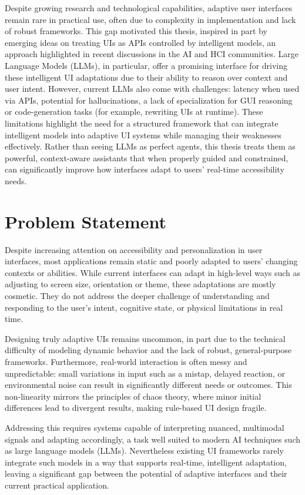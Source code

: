 Despite growing research and technological capabilities, adaptive user interfaces remain rare in practical use, often due to complexity in implementation and lack of robust frameworks. This gap motivated this thesis, inspired in part by emerging ideas on treating UIs as APIs controlled by intelligent models, an approach highlighted in recent discussions in the AI and HCI communities. Large Language Models (LLMs), in particular, offer a promising interface for driving these intelligent UI adaptations due to their ability to reason over context and user intent. However, current LLMs also come with challenges: latency when used via APIs, potential for hallucinations, a lack of specialization for GUI reasoning or code-generation tasks (for example, rewriting UIs at runtime). These limitations highlight the need for a structured framework that can integrate intelligent models into adaptive UI systems while managing their weaknesses effectively. Rather than seeing LLMs as perfect agents, this thesis treats them as powerful, context-aware assistants that when properly guided and constrained, can significantly improve how interfaces adapt to users' real-time accessibility needs.

\section{Problem Statement}
Despite increasing attention on accessibility and personalization in user interfaces, most applications remain static and poorly adapted to users' changing contexts or abilities. While current interfaces can adapt in high-level ways such as adjusting to screen size, orientation or theme, these adaptations are mostly cosmetic. They do not address the deeper challenge of understanding and responding to the user's intent, cognitive state, or physical limitations in real time.

Designing truly adaptive UIs remains uncommon, in part due to the technical difficulty of modeling dynamic behavior and the lack of robust, general-purpose frameworks. Furthermore, real-world interaction is often messy and unpredictable: small variations in input such as a mistap, delayed reaction, or environmental noise can result in significantly different needs or outcomes. This non-linearity mirrors the principles of chaos theory, where minor initial differences lead to divergent results, making rule-based UI design fragile.

Addressing this requires systems capable of interpreting nuanced, multimodal signals and adapting accordingly, a task well suited to modern AI techniques such as large language models (LLMs). Nevertheless existing UI frameworks rarely integrate such models in a way that supports real-time, intelligent adaptation, leaving a significant gap between the potential of adaptive interfaces and their current practical application.

